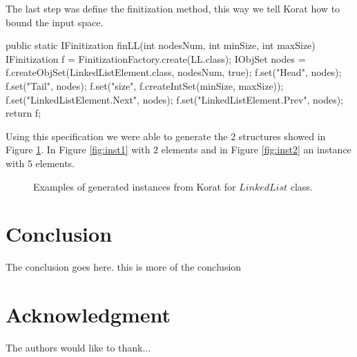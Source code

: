 \documentclass[10pt, conference, compsocconf]{IEEEtran}
\begin{document}
The last step was define the finitization method, this way we tell Korat how to bound the input space.

\begin{code}
public static IFinitization finLL(int nodesNum, int minSize, int maxSize) {
  IFinitization f = FinitizationFactory.create(LL.class);
  IObjSet nodes = f.createObjSet(LinkedListElement.class, nodesNum, true);
  f.set("Head", nodes);
  f.set("Tail", nodes);
  f.set("size", f.createIntSet(minSize, maxSize));
  f.set("LinkedListElement.Next", nodes);
  f.set("LinkedListElement.Prev", nodes);
  return f;
}
\end{code}

Using this specification we were able to generate the 2 structures showed in Figure \ref{fig:insts}. In Figure \ref{fig:inst1} with $2$ elements
and in Figure \ref{fig:inst2} an instance with $5$ elements.

\begin{figure}[!ht]
\centerline{
\hfil
{}}
\caption{Examples of generated instances from Korat for $LinkedList$ class.}
\label{fig:insts}
\end{figure}

\section{Conclusion}
The conclusion goes here. this is more of the conclusion

\section*{Acknowledgment}
The authors would like to thank...

\nocite{*}
\newcommand{\BIBdecl}{\footnotesize{\setlength{\itemsep}{-\baselineskip}}}


%
\end{document}
